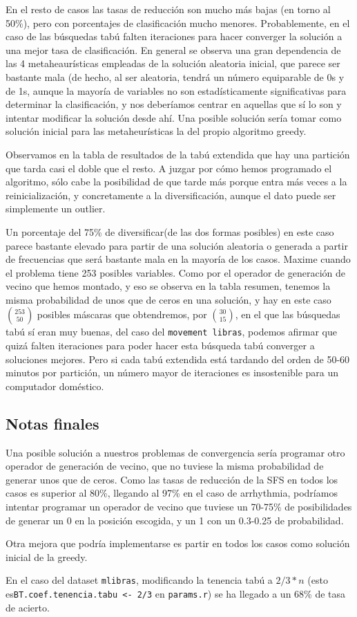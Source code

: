 \documentclass[a4paper,11pt]{article}
\begin{document}
  En el resto de casos las tasas de reducción son mucho más bajas (en torno al 50\%), pero con porcentajes de clasificación
  mucho menores. Probablemente, en el caso de las búsquedas tabú falten iteraciones para hacer converger la solución a una mejor
  tasa de clasificación. En general se observa una gran dependencia de las 4 metaheaurísticas empleadas de la solución aleatoria
  inicial, que parece ser bastante mala (de hecho, al ser aleatoria, tendrá un número equiparable de 0s y de 1s, aunque la mayoría
  de variables no son estadísticamente significativas para determinar la clasificación, y nos deberíamos centrar en aquellas
  que sí lo son y intentar modificar la solución desde ahí. Una posible solución sería tomar como solución inicial para las metaheurísticas
  la del propio algoritmo greedy.
  
  Observamos en la tabla de resultados de la tabú extendida que hay una partición que tarda casi el doble que el resto.
  A juzgar por cómo hemos programado el algoritmo, sólo cabe la posibilidad de que tarde más porque entra más veces a la
  reinicialización, y concretamente a la diversificación, aunque el dato puede ser simplemente un outlier.
  
  Un porcentaje del 75\% de diversificar(de las dos formas posibles) en este caso parece bastante
  elevado para partir de una solución aleatoria o generada a partir de frecuencias que será bastante mala en la mayoría de los casos. Maxime cuando el problema
  tiene 253 posibles variables. Como por el operador de generación de vecino que hemos montado, y eso se observa en la tabla
  resumen, tenemos la misma probabilidad de unos que de ceros en una solución, y hay en este caso $\binom{253}{50}$ posibles
  máscaras que obtendremos, por $\binom{30}{15}$, en el que las búsquedas tabú sí eran muy buenas,
  del caso del \texttt{movement libras}, podemos afirmar que quizá falten iteraciones para poder hacer esta búsqueda tabú 
  converger a soluciones mejores. Pero si cada tabú extendida está tardando del orden de 50-60 minutos por partición,
  un número mayor de iteraciones es insostenible para un computador doméstico.
  
  \subsection{Notas finales}
  
  Una posible solución a nuestros problemas de convergencia sería programar otro operador de generación de vecino, que
  no tuviese la misma probabilidad de generar unos que de ceros. Como las tasas de reducción de la SFS en todos los casos
  es superior al 80\%, llegando al 97\% en el caso de arrhythmia, podríamos intentar programar un operador de vecino que
  tuviese un 70-75\% de posibilidades de generar un 0 en la posición escogida, y un 1 con un 0.3-0.25 de probabilidad.
  
  Otra mejora que podría implementarse es partir en todos los casos como solución inicial de la greedy.
  
  En el caso del dataset \texttt{mlibras}, modificando la tenencia tabú a $2/3*n$ (esto es\texttt{BT.coef.tenencia.tabu <- 2/3}
  en \texttt{params.r}) se ha llegado a un 68\% de tasa de acierto.
  
  
\end{document}
